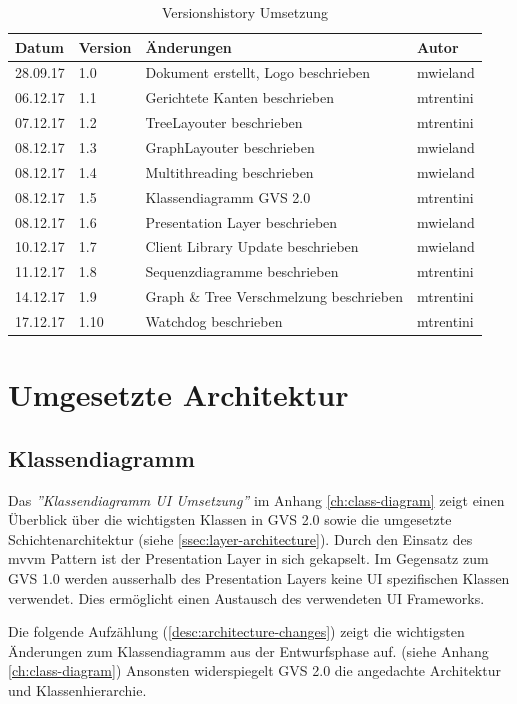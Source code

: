 \documentclass[11pt,a4paper,english,oneside]{book}
\numberwithin{equation}{chapter}
\begin{document}
	\begin{table}[h!]
	\centering
	\begin{tabularx}{\linewidth}{l l X l}
		\toprule 
		Datum & Version & Änderungen & Autor \\
		\midrule
		28.09.17 & 1.0 & Dokument erstellt, Logo beschrieben & mwieland \\
		06.12.17 & 1.1 & Gerichtete Kanten beschrieben & mtrentini \\
		07.12.17 & 1.2 & TreeLayouter beschrieben & mtrentini \\
		08.12.17 & 1.3 & GraphLayouter beschrieben & mwieland \\
		08.12.17 & 1.4 & Multithreading beschrieben & mwieland \\
		08.12.17 & 1.5 & Klassendiagramm GVS 2.0 & mtrentini \\
		08.12.17 & 1.6 & Presentation Layer beschrieben & mwieland \\
		10.12.17 & 1.7 & Client Library Update beschrieben & mwieland \\
		11.12.17 & 1.8 & Sequenzdiagramme beschrieben & mtrentini \\
		14.12.17 & 1.9 & Graph \& Tree Verschmelzung beschrieben & mtrentini \\
		17.12.17 & 1.10 & Watchdog beschrieben & mtrentini \\
		\bottomrule 
	\end{tabularx} 
	\caption{Versionshistory Umsetzung} 
	\end{table}



	\section{Umgesetzte Architektur}
	
	\subsection{Klassendiagramm}
	Das \textit{''Klassendiagramm UI Umsetzung''} im Anhang \ref{ch:class-diagram} zeigt einen Überblick über die wichtigsten Klassen in GVS 2.0 sowie die umgesetzte Schichtenarchitektur (siehe \ref{ssec:layer-architecture}). Durch den Einsatz des \gls{mvvm} Pattern ist der Presentation Layer in sich gekapselt. Im Gegensatz zum GVS 1.0 werden ausserhalb des Presentation Layers keine UI spezifischen Klassen verwendet. Dies ermöglicht einen Austausch des verwendeten UI Frameworks.
	

	\noindent
	Die folgende Aufzählung (\ref{desc:architecture-changes}) zeigt die wichtigsten Änderungen zum Klassendiagramm aus der Entwurfsphase auf. (siehe Anhang \ref{ch:class-diagram}) Ansonsten widerspiegelt GVS 2.0 die angedachte Architektur und Klassenhierarchie.
	
\end{document}

